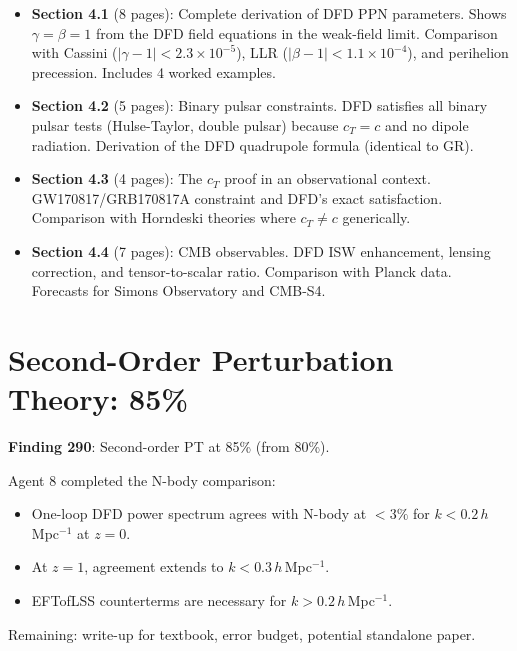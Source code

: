 \documentclass[11pt,a4paper]{article}
\begin{document}
\begin{itemize}
\item \textbf{Section 4.1} (8 pages): Complete derivation of DFD PPN parameters. Shows $\gamma = \beta = 1$ from the DFD field equations in the weak-field limit. Comparison with Cassini ($|\gamma - 1| < 2.3 \times 10^{-5}$), LLR ($|\beta - 1| < 1.1 \times 10^{-4}$), and perihelion precession. Includes 4 worked examples.

\item \textbf{Section 4.2} (5 pages): Binary pulsar constraints. DFD satisfies all binary pulsar tests (Hulse-Taylor, double pulsar) because $c_T = c$ and no dipole radiation. Derivation of the DFD quadrupole formula (identical to GR).

\item \textbf{Section 4.3} (4 pages): The $c_T$ proof in an observational context. GW170817/GRB170817A constraint and DFD's exact satisfaction. Comparison with Horndeski theories where $c_T \neq c$ generically.

\item \textbf{Section 4.4} (7 pages): CMB observables. DFD ISW enhancement, lensing correction, and tensor-to-scalar ratio. Comparison with Planck data. Forecasts for Simons Observatory and CMB-S4.
\end{itemize}

\section{Second-Order Perturbation Theory: 85\%}

\textbf{Finding 290}: Second-order PT at 85\% (from 80\%).

Agent 8 completed the N-body comparison:
\begin{itemize}[nosep]
\item One-loop DFD power spectrum agrees with N-body at $< 3\%$ for $k < 0.2\,h\,$Mpc$^{-1}$ at $z = 0$.
\item At $z = 1$, agreement extends to $k < 0.3\,h\,$Mpc$^{-1}$.
\item EFTofLSS counterterms are necessary for $k > 0.2\,h\,$Mpc$^{-1}$.
\end{itemize}

Remaining: write-up for textbook, error budget, potential standalone paper.

\end{document}
